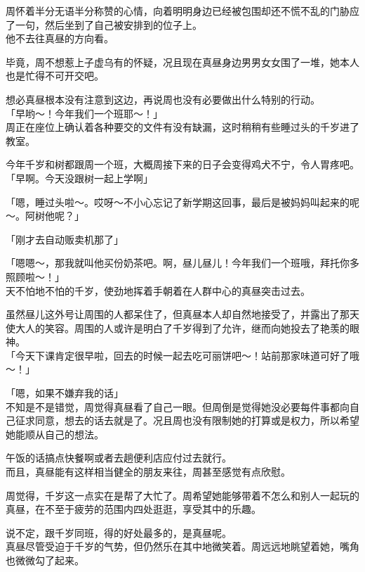 周怀着半分无语半分称赞的心情，向着明明身边已经被包围却还不慌不乱的门胁应了一句，然后坐到了自己被安排到的位子上。\\

他不去往真昼的方向看。

毕竟，周不想惹上子虚乌有的怀疑，况且现在真昼身边男男女女围了一堆，她本人也是忙得不可开交吧。

想必真昼根本没有注意到这边，再说周也没有必要做出什么特别的行动。\\

「早哟～！今年我们一个班耶～！」\\

周正在座位上确认着各种要交的文件有没有缺漏，这时稍稍有些睡过头的千岁进了教室。

今年千岁和树都跟周一个班，大概周接下来的日子会变得鸡犬不宁，令人胃疼吧。\\

「早啊。今天没跟树一起上学啊」

「嗯，睡过头啦～。哎呀～不小心忘记了新学期这回事，最后是被妈妈叫起来的呢～。阿树他呢？」

「刚才去自动贩卖机那了」

「嗯嗯～，那我就叫他买份奶茶吧。啊，昼儿昼儿！今年我们一个班哦，拜托你多照顾啦～！」\\

天不怕地不怕的千岁，使劲地挥着手朝着在人群中心的真昼突击过去。

虽然昼儿这外号让周围的人都呆住了，但真昼本人却自然地接受了，并露出了那天使大人的笑容。周围的人或许是明白了千岁得到了允许，继而向她投去了艳羡的眼神。\\

「今天下课肯定很早啦，回去的时候一起去吃可丽饼吧～！站前那家味道可好了哦～！」

「嗯，如果不嫌弃我的话」\\

不知是不是错觉，周觉得真昼看了自己一眼。但周倒是觉得她没必要每件事都向自己征求同意，想去的话去就是了。况且周也没有限制她的打算或是权力，所以希望她能顺从自己的想法。

午饭的话搞点快餐啊或者去趟便利店应付过去就行。\\

而且，真昼能有这样相当健全的朋友来往，周甚至感觉有点欣慰。

周觉得，千岁这一点实在是帮了大忙了。周希望她能够带着不怎么和别人一起玩的真昼，在不至于疲劳的范围内四处逛逛，享受其中的乐趣。

说不定，跟千岁同班，得的好处最多的，是真昼呢。\\

真昼尽管受迫于千岁的气势，但仍然乐在其中地微笑着。周远远地眺望着她，嘴角也微微勾了起来。
